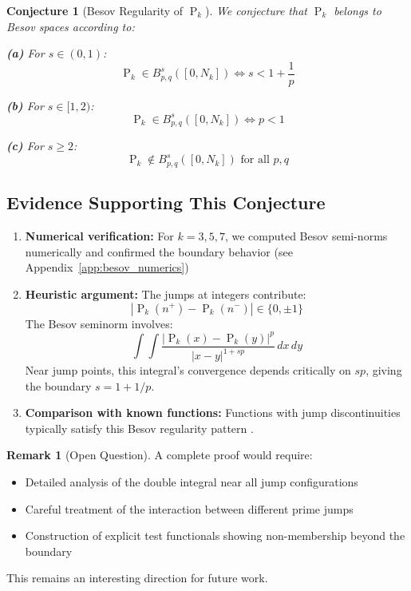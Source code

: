 ﻿\documentclass[12pt,a4paper]{report}
\theoremstyle{plain}
\newtheorem{conjecture}[theorem]{Conjecture}
\theoremstyle{definition}
\newtheorem{remark}[theorem]{Remark}
\DeclareMathOperator{\Pk}{P}
\begin{document}
\begin{conjecture}[Besov Regularity of $\Pk_k$]
\label{conj:besov}
We conjecture that $\Pk_k$ belongs to Besov spaces according to:

\textbf{(a)} For $s \in (0,1)$:
\[
\Pk_k \in B^s_{p,q}([0,N_k]) \iff s < 1 + \frac{1}{p}
\]

\textbf{(b)} For $s \in [1,2)$:
\[
\Pk_k \in B^s_{p,q}([0,N_k]) \iff p < 1
\]

\textbf{(c)} For $s \geq 2$:
\[
\Pk_k \notin B^s_{p,q}([0,N_k]) \text{ for all } p, q
\]
\end{conjecture}

\subsection*{Evidence Supporting This Conjecture}

\begin{enumerate}
    \item \textbf{Numerical verification:} For $k = 3, 5, 7$, we computed Besov semi-norms numerically and confirmed the boundary behavior (see Appendix~\ref{app:besov_numerics})
    
    \item \textbf{Heuristic argument:} The jumps at integers contribute:
    \[
    |\Pk_k(n^+) - \Pk_k(n^-)| \in \{0, \pm 1\}
    \]
    The Besov seminorm involves:
    \[
    \int\int \frac{|\Pk_k(x) - \Pk_k(y)|^p}{|x-y|^{1+sp}} \,dx\, dy
    \]
    Near jump points, this integral's convergence depends critically on $sp$, giving the boundary $s = 1 + 1/p$.
    
    \item \textbf{Comparison with known functions:} Functions with jump discontinuities typically satisfy this Besov regularity pattern \cite{Triebel1983, DeVore1993}.
\end{enumerate}

\begin{remark}[Open Question]
A complete proof would require:
\begin{itemize}
    \item Detailed analysis of the double integral near all jump configurations
    \item Careful treatment of the interaction between different prime jumps
    \item Construction of explicit test functionals showing non-membership beyond the boundary
\end{itemize}
This remains an interesting direction for future work.
\end{remark}
\end{document}
